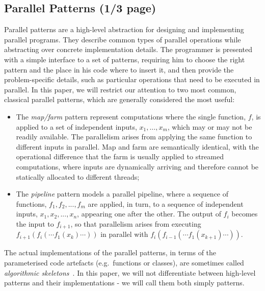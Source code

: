 \documentclass[runningheads]{llncs}
\begin{document}
\subsection{Parallel Patterns (1/3 page)}
\label{sec:patterns}
\noindent
Parallel patterns are a high-level abstraction for designing and implementing parallel programs. They describe common types of parallel operations while abstracting
over concrete implementation details. The programmer is presented with a simple interface to a set of patterns, requiring him to choose the right pattern and the place in his code where
to insert it, and then provide the problem-specific details, such as particular operations that need to be executed in parallel.
In this paper, we will restrict our attention to two most common, classical parallel patterns, which are generally considered the most useful:
\begin{itemize}
\item The \emph{map/farm} pattern represent computations where the single
  function, $f$, is applied to a set of independent inputs, $x_1,\dots,x_m$,
  which may or may not be readily available.
  The parallelism arises from applying the same function to different
  inputs in parallel. Map and farm are semantically identical, with the operational
  difference that the farm is usually applied to streamed computations, where inputs are
  dynamically arriving and therefore cannot be statically allocated to different threads;
\item The \emph{pipeline} pattern models a parallel pipeline, where a sequence of functions, 
$f_{1}, f_{2}, ..., f_{m}$ are applied, in turn, to a sequence of independent inputs, 
$x_{1}, x_{2}, ..., x_{n}$, appearing one after the other. The output of $f_{i}$ becomes the input to $f_{i+1}$, so that
parallelism arises from executing $f_{i+1}(f_i(\cdots f_1(x_k)\cdots))$ in parallel with $f_i(f_{i-1}(\cdots f_1(x_{k+1}) \cdots))$.
\end{itemize}
The actual implementations of the parallel patterns, in terms of the parameterised code artefacts (e.g.~functions or classes), are sometimes
called \emph{algorithmic skeletons}~\cite{cole-manifesto}. In this paper, we will not differentiate between high-level patterns and their
implementations - we will call them both simply patterns.
\end{document}
